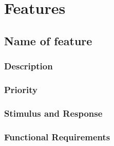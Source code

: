 \section{Features}


\subsection{Name of feature}
\subsubsection{Description}

\subsubsection{Priority}

\subsubsection{Stimulus and Response}

\subsubsection{Functional Requirements}

